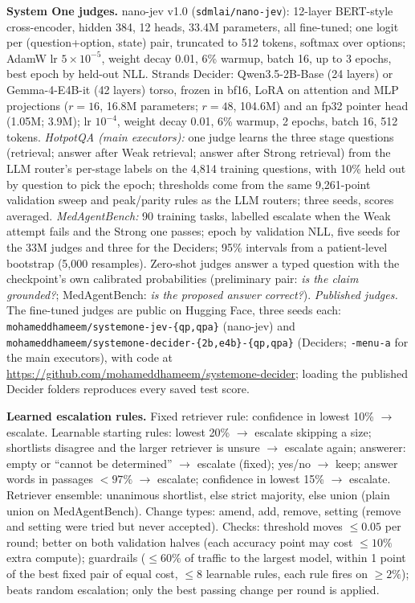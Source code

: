 \documentclass{article}
\begin{document}
\label{app:systemone}\textbf{System One judges.} nano-jev v1.0 (\texttt{sdmlai/nano-jev}): 12-layer BERT-style cross-encoder, hidden 384, 12 heads, 33.4M parameters, all fine-tuned; one logit per (question+option, state) pair, truncated to 512 tokens, softmax over options; AdamW lr $5\times10^{-5}$, weight decay 0.01, 6\% warmup, batch 16, up to 3 epochs, best epoch by held-out NLL. Strands Decider: Qwen3.5-2B-Base (24 layers) or Gemma-4-E4B-it (42 layers) torso, frozen in bf16, LoRA on attention and MLP projections ($r{=}16$, 16.8M parameters; $r{=}48$, 104.6M) and an fp32 pointer head (1.05M; 3.9M); lr $10^{-4}$, weight decay 0.01, 6\% warmup, 2 epochs, batch 16, 512 tokens. \emph{HotpotQA (main executors):} one judge learns the three stage questions (retrieval; answer after Weak retrieval; answer after Strong retrieval) from the LLM router's per-stage labels on the 4,814 training questions, with 10\% held out by question to pick the epoch; thresholds come from the same 9,261-point validation sweep and peak/parity rules as the LLM routers; three seeds, scores averaged. \emph{MedAgentBench:} 90 training tasks, labelled escalate when the Weak attempt fails and the Strong one passes; epoch by validation NLL, five seeds for the 33M judges and three for the Deciders; 95\% intervals from a patient-level bootstrap (5,000 resamples). Zero-shot judges answer a typed question with the checkpoint's own calibrated probabilities (preliminary pair: \emph{is the claim grounded?}; MedAgentBench: \emph{is the proposed answer correct?}). \emph{Published judges.} The fine-tuned judges are public on Hugging Face, three seeds each: \texttt{mohameddhameem/systemone-jev-\{qp,qpa\}} (nano-jev) and \texttt{mohameddhameem/systemone-decider-\{2b,e4b\}-\{qp,qpa\}} (Deciders; \texttt{-menu-a} for the main executors), with code at \url{https://github.com/mohameddhameem/systemone-decider}; loading the published Decider folders reproduces every saved test score.

\label{app:rules}\textbf{Learned escalation rules.} Fixed retriever rule: confidence in lowest 10\% $\rightarrow$ escalate. Learnable starting rules: lowest 20\% $\rightarrow$ escalate skipping a size; shortlists disagree and the larger retriever is unsure $\rightarrow$ escalate again; answerer: empty or ``cannot be determined'' $\rightarrow$ escalate (fixed); yes/no $\rightarrow$ keep; answer words in passages $<97\%$ $\rightarrow$ escalate; confidence in lowest 15\% $\rightarrow$ escalate. Retriever ensemble: unanimous shortlist, else strict majority, else union (plain union on MedAgentBench). Change types: amend, add, remove, setting (remove and setting were tried but never accepted). Checks: threshold moves $\le0.05$ per round; better on both validation halves (each accuracy point may cost $\le10\%$ extra compute); guardrails ($\le60\%$ of traffic to the largest model, within 1 point of the best fixed pair of equal cost, $\le8$ learnable rules, each rule fires on $\ge2\%$); beats random escalation; only the best passing change per round is applied.  
\end{document}
